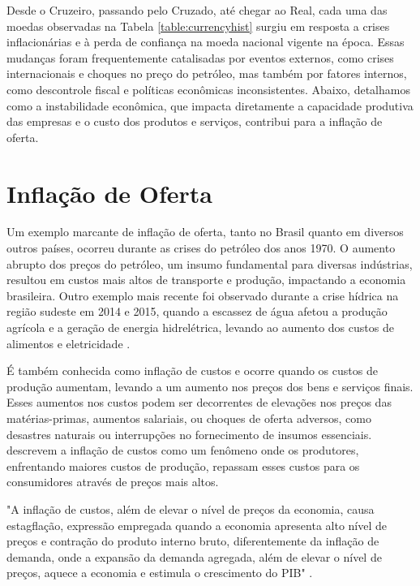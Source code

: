 \documentclass[12pt,oneside,a4paper,chapter=TITLE,english,brazil,sumario=abnt-6027-2012]{abntex2}
\begin{document}
Desde o Cruzeiro, passando pelo Cruzado, até chegar ao Real, cada uma das moedas observadas na Tabela \ref{table:currencyhist} surgiu em resposta a crises inflacionárias e à perda de confiança na moeda nacional vigente na época. Essas mudanças foram frequentemente catalisadas por eventos externos, como crises internacionais e choques no preço do petróleo, mas também por fatores internos, como descontrole fiscal e políticas econômicas inconsistentes. Abaixo, detalhamos como a instabilidade econômica, que impacta diretamente a capacidade produtiva das empresas e o custo dos produtos e serviços, contribui para a inflação de oferta.

\section{Inflação de Oferta}

Um exemplo marcante de inflação de oferta, tanto no Brasil quanto em diversos outros países, ocorreu durante as crises do petróleo dos anos 1970. O aumento abrupto dos preços do petróleo, um insumo fundamental para diversas indústrias, resultou em custos mais altos de transporte e produção, impactando a economia brasileira. Outro exemplo mais recente foi observado durante a crise hídrica na região sudeste em 2014 e 2015, quando a escassez de água afetou a produção agrícola e a geração de energia hidrelétrica, levando ao aumento dos custos de alimentos e eletricidade \cite{crise_hidrica_lais}.

É também conhecida como inflação de custos e ocorre quando os custos de produção aumentam, levando a um aumento nos preços dos bens e serviços finais. Esses aumentos nos custos podem ser decorrentes de elevações nos preços das matérias-primas, aumentos salariais, ou choques de oferta adversos, como desastres naturais ou interrupções no fornecimento de insumos essenciais.  descrevem a inflação de custos como um fenômeno onde os produtores, enfrentando maiores custos de produção, repassam esses custos para os consumidores através de preços mais altos.

"A inflação de custos, além de elevar o nível de preços da economia, causa estagflação, expressão empregada quando a economia apresenta alto nível de preços e contração do produto interno bruto, diferentemente da inflação de demanda, onde a expansão da demanda agregada, além de elevar o nível de preços, aquece a economia e estimula o crescimento do PIB" \cite{cortapasso_estagflacao}.
\end{document}
